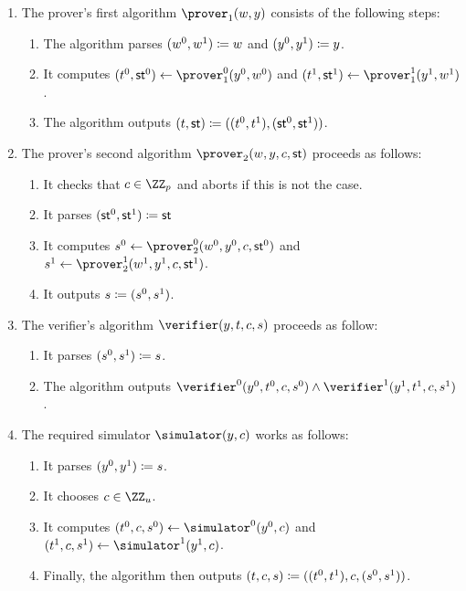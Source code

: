 \documentclass[runningheads]{llncs}
\begin{document}
\begin{enumerate}
  \item
    The prover's first algorithm $\prover_1(w,y)$ consists of the following steps:
    \begin{enumerate}
      \item
        The algorithm parses $(w^0,w^1)\coloneqq w$ and $(y^0,y^1)\coloneqq y$.
      \item
        It computes $(t^0,\st^0)\gets\prover_1^0(y^0,w^0)$ and $(t^1,\st^1)\gets\prover_1^1(y^1,w^1)$.
      \item
	The algorithm outputs $(t,\mathsf{st}) \coloneqq ((t^0,t^1),(\mathsf{st}^0,\mathsf{st}^1))$.
    \end{enumerate}
  \item
    The prover's second algorithm $\prover_2(w,y,c,\st)$ proceeds as follows:
    \begin{enumerate}
      \item
        It checks that $c\in\ZZ_p$ and aborts if this is not the case.
      \item
	It parses $(\mathsf{st}^0,\mathsf{st}^1)\coloneqq \mathsf{st}$
      \item
        It computes $s^0\gets\prover_2^0(w^0,y^0,c,\st^0)$ and $s^1\gets\prover_2^1(w^1,y^1,c,\st^1)$.
      \item
        It outputs $s\coloneqq(s^0,s^1)$.
    \end{enumerate}
  \item
    The verifier's algorithm $\verifier(y,t,c,s)$ proceeds as follow:
    \begin{enumerate}
      \item
        It  parses $(s^0,s^1)\coloneqq s$.
      \item
	The algorithm outputs $\verifier^0(y^0,t^0,c,s^0)\land\verifier^1(y^1,t^1,c,s^1)$.
    \end{enumerate}
  \item
    The required simulator $\simulator(y,c)$ works as follows:
    \begin{enumerate}
      \item
        It parses $(y^0,y^1)\coloneqq s$.
      \item
        It chooses $c\in\ZZ_u$.
      \item
        It computes $(t^0,c,s^0)\gets\simulator^0(y^0,c)$ and $(t^1,c,s^1)\gets\simulator^1(y^1,c)$.
      \item
        Finally, the algorithm then outputs $(t,c,s)\coloneqq((t^0,t^1),c,(s^0,s^1))$.
    \end{enumerate}
\end{enumerate}
\end{document}
